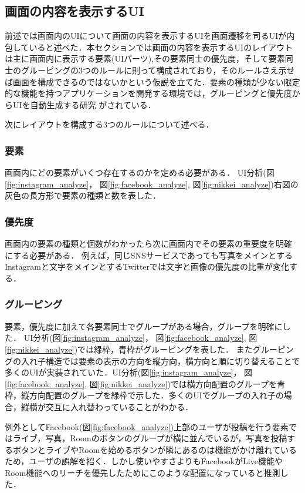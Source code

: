 \subsection{画面の内容を表示するUI}
前述では画面内のUIについて画面の内容を表示するUIを画面遷移を司るUIが内包していると述べた．本セクションでは画面の内容を表示するUIのレイアウトは主に画面内に表示する要素(UIパーツ),その要素同士の優先度，そして要素同士のグルーピングの3つのルールに則って構成されており，そのルールさえ示せば画面を構成できるのではないかという仮説を立てた．要素の種類が少ない限定的な機能を持つアプリケーションを開発する環境では，グルーピングと優先度からUIを自動生成する研究\cite{m-base} がされている．

次にレイアウトを構成する3つのルールについて述べる．
\subsubsection{要素}
画面内にどの要素がいくつ存在するのかを定める必要がある．
UI分析(図\ref{fig:instagram_analyze}， 図\ref{fig:facebook_analyze}, 図\ref{fig:nikkei_analyze})右図の灰色の長方形で要素の種類と数を表した．
\subsubsection{優先度}
画面内の要素の種類と個数がわかったら次に画面内でその要素の重要度を明確にする必要がある．
例えば，同じSNSサービスであっても写真をメインとするInstagramと文字をメインとするTwitterでは文字と画像の優先度の比重が変化する．


\subsubsection{グルーピング}
要素，優先度に加えて各要素同士でグループがある場合，グループを明確にした．
UI分析(図\ref{fig:instagram_analyze}， 図\ref{fig:facebook_analyze}, 図\ref{fig:nikkei_analyze})では緑枠，青枠がグルーピングを表した．
またグルーピングの入れ子構造では要素の表示の方向を縦方向，横方向と順に切り替えることで多くのUIが実装されていた．UI分析(図\ref{fig:instagram_analyze}， 図\ref{fig:facebook_analyze}, 図\ref{fig:nikkei_analyze})では横方向配置のグループを青枠，縦方向配置のグループを緑枠で示した．多くのUIでグループの入れ子の場合，縦横が交互に入れ替わっていることがわかる．

例外としてFacebook(図\ref{fig:facebook_analyze})上部のユーザが投稿を行う要素ではライブ，写真，Roomのボタンのグループが横に並んでいるが，写真を投稿するボタンとライブやRoomを始めるボタンが隣にあるのは機能がかけ離れているため，ユーザの誤解を招く．しかし使いやすさよりもFacebookがLive機能やRoom機能へのリーチを優先したためにこのような配置になっていると推測した．


